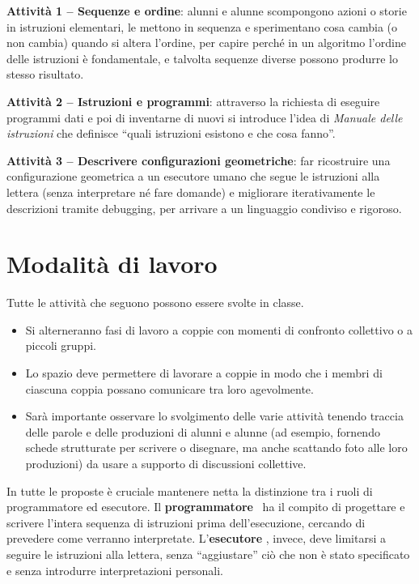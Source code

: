 \textbf{Attività 1 -- Sequenze e ordine}: alunni e alunne scompongono azioni o storie in istruzioni elementari, le mettono in sequenza e sperimentano cosa cambia (o non cambia) quando si altera l'ordine, per capire perché in un algoritmo l'ordine delle istruzioni è fondamentale, e talvolta sequenze diverse possono produrre lo stesso risultato.

\textbf{Attività 2 -- Istruzioni e programmi}: attraverso la richiesta di eseguire programmi dati e poi di inventarne di nuovi si introduce l'idea di \emph{Manuale delle istruzioni} che definisce ``quali istruzioni esistono e che cosa fanno''.

\textbf{Attività 3 -- Descrivere configurazioni geometriche}: far ricostruire una configurazione geometrica a un esecutore umano che segue le istruzioni alla lettera (senza interpretare né fare domande) e migliorare iterativamente le descrizioni tramite debugging, per arrivare a un linguaggio condiviso e rigoroso.

\section{Modalità di lavoro }\label{modalituxe0-di-lavoro}

Tutte le attività che seguono possono essere svolte in classe.

\begin{itemize}
\item
  Si alterneranno fasi di lavoro a coppie con momenti di confronto collettivo o a piccoli gruppi.
\item
  Lo spazio deve permettere di lavorare a coppie in modo che i membri di ciascuna coppia possano comunicare tra loro agevolmente.
\item
  Sarà importante osservare lo svolgimento delle varie attività tenendo traccia delle parole e delle produzioni di alunni e alunne (ad esempio, fornendo schede strutturate per scrivere o disegnare, ma anche scattando foto alle loro produzioni) da usare a supporto di discussioni collettive.
\end{itemize}

In tutte le proposte è cruciale mantenere netta la distinzione tra i ruoli di programmatore ed esecutore. Il \textbf{programmatore} \guideiconProgrammatore\ ha il compito di progettare e scrivere l'intera sequenza di istruzioni prima dell'esecuzione, cercando di prevedere come verranno interpretate. L'\textbf{esecutore} \guideiconEsecutore, invece, deve limitarsi a seguire le istruzioni alla lettera, senza ``aggiustare'' ciò che non è stato specificato e senza introdurre interpretazioni personali.

